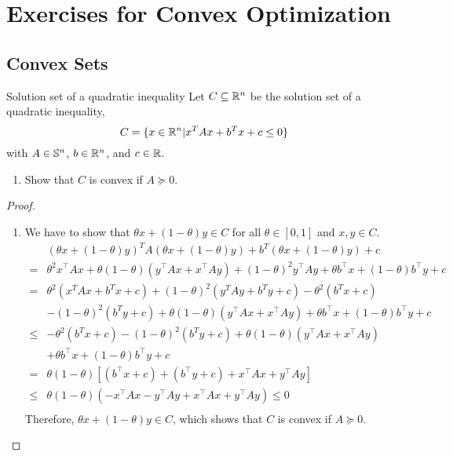 \chapter{Exercises for Convex Optimization}

\section{Convex Sets}

\begin{exercise}{Solution set of a quadratic inequality}
	Let $C\subseteq{\mathbb R}^{n}$ be the solution set of a quadratic inequality,
	\begin{equation*}
		C=\{x\in{\mathbb R}^{n}\vert x^{T}Ax+b^{T}x+c\leq 0\}
	\end{equation*}
	with $A\in{\mathbb S}^{n}$, $b\in{\mathbb R}^{n}$, and $c\in{\mathbb R}$.
	\begin{enumerate}
		\item Show that $C$ is convex if $A\succeq 0$.
	\end{enumerate}
\end{exercise}

\begin{proof}
	\begin{enumerate}
		\item
		      We have to show that $\theta x+(1-\theta)y\in C$ for all $\theta\in[0,1]$ and $x,y\in C$.
		      \begin{equation*}
			      \begin{aligned}
				           & (\theta x+(1-\theta)y)^{T}A(\theta x+(1-\theta)y)+b^{T}(\theta x+(1-\theta)y)+c                                          \\
				      =    & \theta^2x^{\top}Ax+\theta(1-\theta)(y^{\top}Ax+x^{\top}Ay)+(1-\theta)^2y^{\top}Ay+\theta b^{\top}x+(1-\theta)b^{\top}y+c \\
				      =    & \theta^2(x^{T}Ax+b^{T}x+c)+(1-\theta)^2(y^{T}Ay+b^{T}y+c)-\theta^2(b^{T}x+c)                                             \\
				           & -(1-\theta)^2(b^{T}y+c)+\theta(1-\theta)(y^{\top}Ax+x^{\top}Ay)+\theta b^{\top}x+(1-\theta)b^{\top}y+c                   \\
				      \leq & -\theta^2(b^{T}x+c)-(1-\theta)^2(b^{T}y+c)+\theta(1-\theta)(y^{\top}Ax+x^{\top}Ay)                                       \\
				           & +\theta b^{\top}x+(1-\theta)b^{\top}y+c                                                                                  \\
				      =    & \theta(1-\theta)[(b^{\top}x+c)+(b^{\top}y+c)+x^{\top}Ax+y^{\top}Ay]                                                      \\
				      \leq & \theta(1-\theta)(-x^{\top}Ax-y^{\top}Ay+x^{\top}Ax+y^{\top}Ay)\leq 0                                                     \\
			      \end{aligned}
		      \end{equation*}
		      Therefore, $\theta x+(1-\theta)y\in C$, which shows that $C$ is convex if $A\succeq 0$.
	\end{enumerate}

\end{proof}
